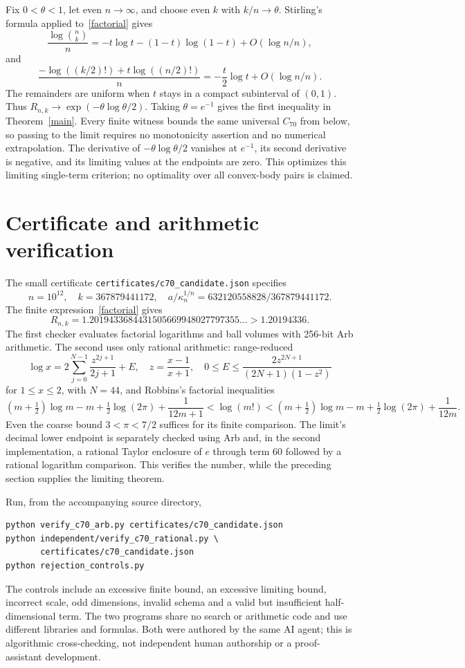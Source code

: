 \documentclass[11pt]{amsart}
\begin{document}
Fix $0<\theta<1$, let even $n\to\infty$, and choose even $k$ with
$k/n\to\theta$. Stirling's formula applied to~\eqref{factorial} gives
\[
 \frac{\log\binom nk}{n}
 =-t\log t-(1-t)\log(1-t)+O(\log n/n),
\]
and
\[
 \frac{-\log((k/2)!)+t\log((n/2)!)}n
 =-\frac t2\log t+O(\log n/n).
\]
The remainders are uniform when $t$ stays in a compact subinterval of
$(0,1)$. Thus $R_{n,k}\to\exp(-\theta\log\theta/2)$.
Taking $\theta=e^{-1}$ gives the first inequality in Theorem~\ref{main}.
Every finite witness bounds the same universal $C_{70}$ from below, so
passing to the limit requires no monotonicity assertion and no numerical
extrapolation. The derivative of $-\theta\log\theta/2$ vanishes at
$e^{-1}$, its second derivative is negative, and its limiting values at
the endpoints are zero. This optimizes this limiting single-term criterion;
no optimality over all convex-body pairs is claimed.

\section{Certificate and arithmetic verification}
The small certificate \texttt{certificates/c70\_candidate.json} specifies
\[
 n=10^{12},\quad k=367879441172,\quad
 a/\kappa_n^{1/n}=632120558828/367879441172.
\]
The finite expression~\eqref{factorial} gives
\[
 R_{n,k}=1.2019433684431505669948027797355\ldots>1.20194336.
\]
The first checker evaluates factorial logarithms and ball volumes with
256-bit Arb arithmetic. The second uses only rational arithmetic:
range-reduced
\[
 \log x=2\sum_{j=0}^{N-1}\frac{z^{2j+1}}{2j+1}+E,
 \quad z=\frac{x-1}{x+1},\quad
 0\le E\le\frac{2z^{2N+1}}{(2N+1)(1-z^2)}
\]
for $1\le x\le2$, with $N=44$, and Robbins's factorial inequalities
\[
 (m+\tfrac12)\log m-m+\tfrac12\log(2\pi)+\frac1{12m+1}
 <\log(m!)<
 (m+\tfrac12)\log m-m+\tfrac12\log(2\pi)+\frac1{12m}.
\]
Even the coarse bound $3<\pi<7/2$ suffices for its finite comparison.
The limit's decimal lower endpoint is separately checked using Arb and,
in the second implementation, a rational Taylor enclosure of $e$ through
term 60 followed by a rational logarithm comparison. This verifies the
number, while the preceding section supplies the limiting theorem.

Run, from the accompanying source directory,
\begin{verbatim}
python verify_c70_arb.py certificates/c70_candidate.json
python independent/verify_c70_rational.py \
       certificates/c70_candidate.json
python rejection_controls.py
\end{verbatim}
The controls include an excessive finite bound, an excessive limiting
bound, incorrect scale, odd dimensions, invalid schema and a valid but
insufficient half-dimensional term. The two programs share no search or
arithmetic code and use different libraries and formulas. Both were
authored by the same AI agent; this is algorithmic cross-checking, not
independent human authorship or a proof-assistant development.
\end{document}
